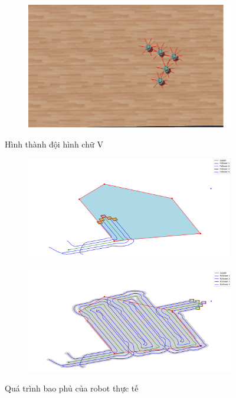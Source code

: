 \begin{figure}[h!]
\begin{subfigure}[b]{0.48\textwidth}
    \caption{}
    \end{subfigure}
    \begin{subfigure}[b]{0.48\textwidth}
    \centering
    \includegraphics[width=\textwidth]{chapter5/image/buoc3.png}
    \caption{}
    \end{subfigure}
    \caption{Hình thành đội hình chữ V}
    \label{fig:Vformation}
\end{figure}

\begin{figure}[h!]
    \centering
    \begin{subfigure}[b]{0.49\textwidth}
    \centering
    \includegraphics[width=\textwidth]{chapter5/image/quydao.png}
    \caption{}
    \end{subfigure}
    \begin{subfigure}[b]{0.49\textwidth}
    \centering
    \includegraphics[width=\textwidth]{chapter5/image/rate.png}
    \caption{}
    \end{subfigure}
    \caption{Quá trình bao phủ của robot thực tế}
    \label{fig:noobs}
\end{figure}

